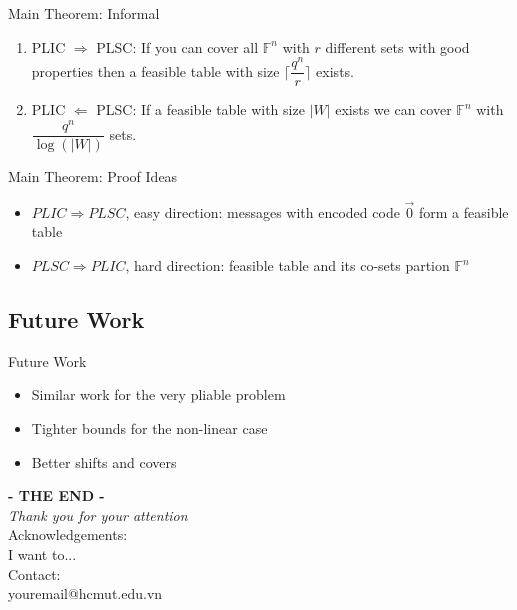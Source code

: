 \documentclass[xcolor=dvipsnames, aspectratio=169]{beamer}
\begin{document}
\begin{frame}{Main Theorem: Informal}
	\begin{theorem}
		\begin{enumerate}
			\item<1->
			PLIC $\Rightarrow$ PLSC: If you can cover all $\mathbb{F}^n$ with $r$ different sets with good properties then a feasible table with size $\lceil \dfrac{q^n}{r}\rceil $ exists.
			\item<2->
			PLIC $\Leftarrow$ PLSC:	If a feasible table with size $|W|$ exists we can cover $\mathbb{F}^n$ with $\dfrac{q^n}{\log(|W|)}$ sets.
		\end{enumerate}
	\end{theorem}
\end{frame}

\begin{frame}{Main Theorem: Proof Ideas}
	\begin{itemize}
		\item<1-> $PLIC \Rightarrow PLSC$, easy direction: messages with encoded code $\overrightarrow{0}$ form a feasible table
		
		\item<2-> $PLSC \Rightarrow PLIC$, hard direction: feasible table and its co-sets partion $\mathbb{F}^n$
	\end{itemize}
\end{frame}

\subsection{Future Work}
\begin{frame}{Future Work}
	\begin{itemize}
		\item<1-> Similar work for the very pliable problem
		\item<2-> Tighter bounds for the non-linear case
		\item<3-> Better shifts and covers
		
	\end{itemize}
\end{frame}





\begin{frame}
    \centering
    \vspace{1cm}
    \textbf{\Huge{- THE END - }}\\
    \vspace{0.2cm}
    \textit{\Large{Thank you for your attention}}\\
    \vspace{15pt}
    Acknowledgements:\\
    I want to...\\
    \vspace{20pt}
    Contact:\\
    youremail@hcmut.edu.vn
\end{frame}
\end{document}
